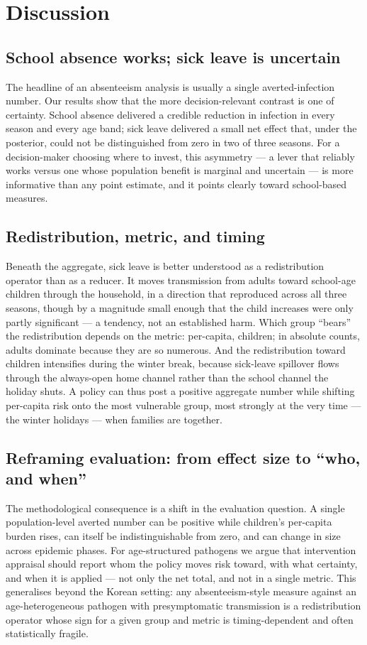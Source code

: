 \documentclass[12pt]{article}
\theoremstyle{plain}
\theoremstyle{remark}
\theoremstyle{definition}
\begin{document}
\section{Discussion}
\subsection{School absence works; sick leave is uncertain}
The headline of an absenteeism analysis is usually a single averted-infection number. Our results show that the more decision-relevant contrast is one of certainty. School absence delivered a credible reduction in infection in every season and every age band; sick leave delivered a small net effect that, under the posterior, could not be distinguished from zero in two of three seasons. For a decision-maker choosing where to invest, this asymmetry --- a lever that reliably works versus one whose population benefit is marginal and uncertain --- is more informative than any point estimate, and it points clearly toward school-based measures.

\subsection{Redistribution, metric, and timing}
Beneath the aggregate, sick leave is better understood as a redistribution operator than as a reducer. It moves transmission from adults toward school-age children through the household, in a direction that reproduced across all three seasons, though by a magnitude small enough that the child increases were only partly significant --- a tendency, not an established harm. Which group ``bears'' the redistribution depends on the metric: per-capita, children; in absolute counts, adults dominate because they are so numerous. And the redistribution toward children intensifies during the winter break, because sick-leave spillover flows through the always-open home channel rather than the school channel the holiday shuts. A policy can thus post a positive aggregate number while shifting per-capita risk onto the most vulnerable group, most strongly at the very time --- the winter holidays --- when families are together.

\subsection{Reframing evaluation: from effect size to ``who, and when''}
The methodological consequence is a shift in the evaluation question. A single population-level averted number can be positive while children's per-capita burden rises, can itself be indistinguishable from zero, and can change in size across epidemic phases. For age-structured pathogens we argue that intervention appraisal should report whom the policy moves risk toward, with what certainty, and when it is applied --- not only the net total, and not in a single metric. This generalises beyond the Korean setting: any absenteeism-style measure against an age-heterogeneous pathogen with presymptomatic transmission is a redistribution operator whose sign for a given group and metric is timing-dependent and often statistically fragile.
\end{document}
